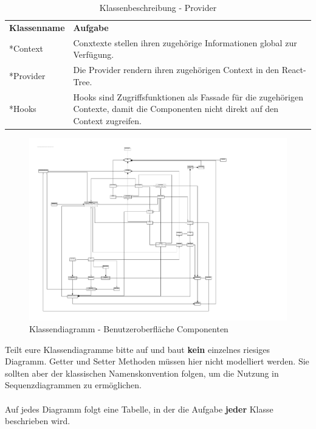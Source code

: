 \begin{table}[h]
	\centering
	\begin{tabularx}{\textwidth}{X X}
		\rowcolor[HTML]{C0C0C0} 
		\textbf{Klassenname} & \textbf{Aufgabe} \\
		*Context & Conxtexte stellen ihren zugehörige Informationen global zur Verfügung.  \\
		\rowcolor[HTML]{E7E7E7} 
		*Provider & Die Provider rendern ihren zugehörigen Context in den React-Tree. \\
		*Hooks & Hooks sind Zugriffsfunktionen als Fassade für die zugehörigen Contexte, damit die Componenten nicht direkt auf den Context zugreifen. \\
	\end{tabularx}
	\caption{Klassenbeschreibung - Provider}
	\label{table:klassenbeschreibung-provider}
\end{table}
\newpage

\begin{figure}[H]
	\hspace{-3cm}
	\includegraphics[scale = 0.9]{./img/diagrams/web-class}
	\caption{Klassendiagramm - Benutzeroberfläche Componenten}
\end{figure}
\newpage

\begin{tcolorbox}
Teilt eure Klassendiagramme bitte auf und baut \textbf{kein} einzelnes riesiges Diagramm.
Getter und Setter Methoden müssen hier nicht modelliert werden.
Sie sollten aber der klassischen Namenskonvention folgen, um die Nutzung in Sequenzdiagrammen zu ermöglichen.
\\\\
Auf jedes Diagramm folgt eine Tabelle, in der die Aufgabe \textbf{jeder} Klasse beschrieben wird.
\end{tcolorbox}

